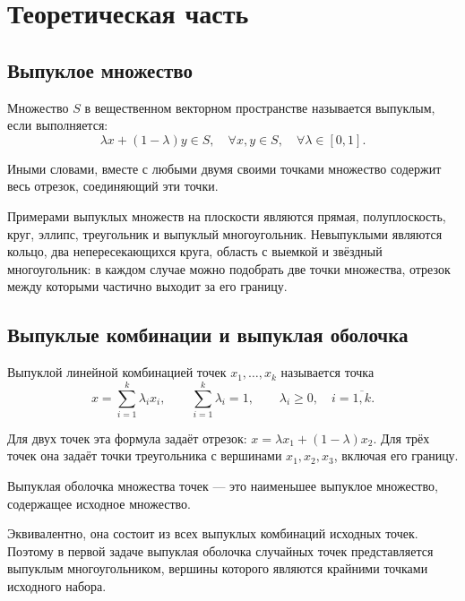 \section{Теоретическая часть}

\subsection{Выпуклое множество}

\begin{definition}
Множество $S$ в вещественном векторном пространстве называется выпуклым, если выполняется: 
\[
	\lambda x+(1-\lambda)y\in S, \quad \forall x,y\in S, \quad \forall \lambda\in[0,1].
\]
\end{definition}
Иными словами, вместе с любыми двумя своими точками множество содержит весь отрезок, соединяющий эти точки.

Примерами выпуклых множеств на плоскости являются прямая, полуплоскость, круг, эллипс, треугольник и выпуклый многоугольник. Невыпуклыми являются кольцо, два непересекающихся круга, область с выемкой и звёздный многоугольник: в каждом случае можно подобрать две точки множества, отрезок между которыми частично выходит за его границу.

\subsection{Выпуклые комбинации и выпуклая оболочка}

\begin{definition}
Выпуклой линейной комбинацией точек $x_1,\ldots,x_k$ называется точка
\[
x=\sum_{i=1}^{k}\lambda_i x_i,
\qquad
\sum_{i=1}^{k}\lambda_i=1,
\qquad
\lambda_i\geq 0,\quad i=\overline{1,k}.
\]
\end{definition}

Для двух точек эта формула задаёт отрезок: $x=\lambda x_1+(1-\lambda)x_2$. Для трёх точек она задаёт точки треугольника с вершинами $x_1,x_2,x_3$, включая его границу.

\begin{definition}
	Выпуклая оболочка множества точек --- это наименьшее выпуклое множество, содержащее исходное множество.
\end{definition}
 Эквивалентно, она состоит из всех выпуклых комбинаций исходных точек. Поэтому в первой задаче выпуклая оболочка случайных точек представляется выпуклым многоугольником, вершины которого являются крайними точками исходного набора.
